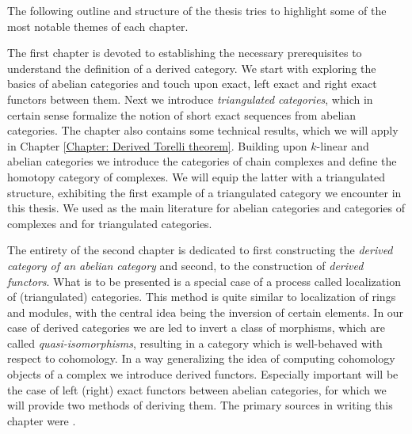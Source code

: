 

The following outline and structure of the thesis tries to highlight some of the most notable themes of each chapter.

The first chapter is devoted to establishing the necessary prerequisites to understand the definition of a derived category. We start with exploring the basics of abelian categories and touch upon exact, left exact and right exact functors between them. Next we introduce \emph{triangulated categories}, which in certain sense formalize the notion of short exact sequences from abelian categories. The chapter also contains some technical results, which we will apply in Chapter \ref{Chapter: Derived Torelli theorem}.
Building upon $k$-linear and abelian categories we introduce the categories of chain complexes and define the homotopy category of complexes. We will equip the latter with a triangulated structure, exhibiting the first example of a triangulated category we encounter in this thesis. We used \cite{kashiwara2006categories} as the main literature for abelian categories and categories of complexes and \cite{huybrechts2006fouriermukai} for triangulated categories.

The entirety of the second chapter is dedicated to first constructing the \emph{derived category of an abelian category} and second, to the construction of \emph{derived functors}. What is to be presented is a special case of a process called localization of (triangulated) categories. This method is quite similar to localization of rings and modules, with the central idea being the inversion of certain elements. In our case of derived categories we are led to invert a class of morphisms, which are called \emph{quasi-isomorphisms}, resulting in
a category which is well-behaved with respect to cohomology. In a way generalizing the idea of computing cohomology objects of a complex we introduce derived functors. Especially important will be the case of left (\resp right) exact functors between abelian categories, for which we will provide two methods of deriving them. The primary sources in writing this chapter were \cite{gelfand2002methods,milicic-dercat}.
%
%
%
%
%

